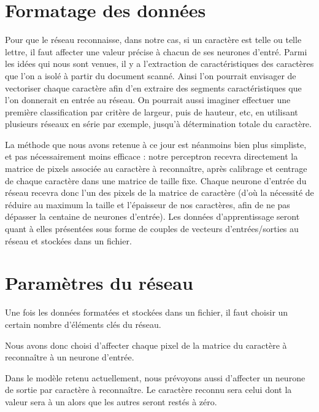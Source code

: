 
\section{Formatage des donn\'ees} %
\label{subsec:formatage_des_donnees}

Pour que le r\'eseau reconnaisse, dans notre cas, si un caract\`ere est
telle ou telle lettre, il faut affecter une valeur pr\'ecise à chacun de
ses neurones d'entr\'e.
Parmi les id\'ees qui nous sont venues, il y a l'extraction de
caract\'eristiques des caract\`eres que l'on a isol\'e \`a partir du document
scann\'e. Ainsi l'on pourrait envisager de vectoriser chaque caract\`ere
afin d'en extraire des segments caract\'eristiques que l'on donnerait en
entr\'ee au r\'eseau. On pourrait aussi imaginer effectuer une premi\`ere
classification par crit\`ere de largeur, puis de hauteur, etc, en utilisant
plusieurs r\'eseaux en s\'erie par exemple, jusqu'\`a d\'etermination totale du
caract\`ere.

La m\'ethode que nous avons retenue \`a ce jour est n\'eanmoins bien
plus simpliste, et pas n\'ecessairement moins efficace : notre
perceptron recevra directement la matrice de pixels associ\'ee au
caract\`ere \`a reconna\^itre, apr\`es calibrage et centrage de chaque
caract\`ere dans une matrice de taille fixe.
Chaque neurone d'entr\'ee du r\'eseau recevra donc l'un des pixels de la
matrice de caract\`ere (d'o\`u la n\'ecessit\'e de r\'eduire au maximum
la taille et l'\'epaisseur de nos caract\`eres, afin de ne pas
d\'epasser la centaine de neurones d'entr\'ee).
Les donn\'ees d'apprentissage seront quant \`a elles pr\'esent\'ees sous
forme de couples de vecteurs d'entr\'ees/sorties au r\'eseau et
stock\'ees dans un fichier.



\section{Param\`etres du r\'eseau} %
\label{subsec:choix_des_parametres_du_reseau}

Une fois les donn\'ees format\'ees et stock\'ees dans un fichier, il
faut choisir un certain nombre d'éléments clés du réseau.

Nous avons donc choisi d'affecter chaque pixel de la matrice du
caract\`ere \`a reconna\^itre \`a un neurone d'entr\'ee.

Dans le mod\`ele retenu actuellement, nous pr\'evoyons aussi d'affecter
un neurone de sortie par caract\`ere \`a reconna\^itre. Le caract\`ere
reconnu sera celui dont la valeur sera \`a un alors que les autres seront
rest\'es \`a z\'ero.

